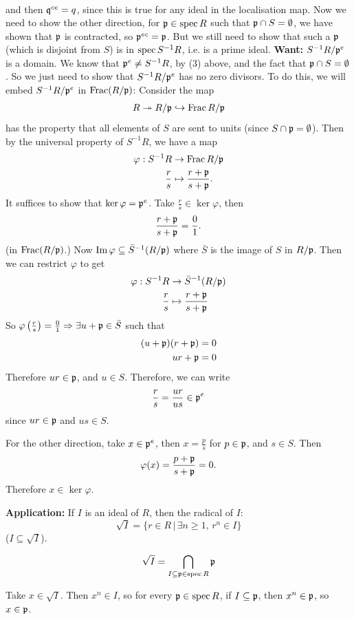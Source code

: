 \documentclass{article}
\begin{document}
\begin{enumerate}
\begin{align*}
    \end{align*}
    and then $\mathfrak{q}^{ce}=q$, since this is true for any ideal in the localisation map. \gap
    Now we need to show the other direction, for $\mathfrak{p} \in \operatorname{spec} R$ such that $\mathfrak{p} \cap S = \emptyset$, we have shown that $\mathfrak{p}$ is contracted, so $\mathfrak{p}^{ec}=\mathfrak{p}$. But we still need to show that such a $\mathfrak{p}$ (which is disjoint from $S$) is in $\operatorname{spec} S^{-1}R$, i.e. is a prime ideal. \gap 
    \textbf{Want:} $S^{-1}R/ \mathfrak{p}^{e}$ is a domain. We know that $\mathfrak{p}^{e} \neq S^{-1}R$, by (3) above, and the fact that $\mathfrak{p} \cap S = \emptyset$. So we just need to show that $S^{-1}R/\mathfrak{p}^{e}$ has no zero divisors. To do this, we will embed $S^{-1}R/\mathfrak{p}^{e}$ in $\operatorname{Frac}(R/\mathfrak{p})$:
    \proof Consider the map 
    \begin{align*}
        R \twoheadrightarrow R/ \mathfrak{p} \hookrightarrow \operatorname{Frac}{R/\mathfrak{p}}
    \end{align*}
    has the property that all elements of $S$ are sent to units (since $S \cap \mathfrak{p} = \emptyset$). Then by the universal property of $S^{-1}R$, we have a map \begin{align*}
        \varphi: S^{-1}R &\to \operatorname{Frac}{R/\mathfrak{p}}\\
        \frac{r}{s} &\mapsto \frac{r+\mathfrak{p}}{s+\mathfrak{p}}.
    \end{align*}
    It suffices to show that $\ker \varphi = \mathfrak{p}^{e}$. Take $\frac{r}{s} \in \ker \varphi$, then \[\frac{r+\mathfrak{p}}{s+\mathfrak{p}} = \frac{0}{1}.\] (in $\operatorname{Frac}(R/\mathfrak{p})$.) Now $\operatorname{Im} \varphi \subseteq \bar S^{-1}(R/\mathfrak{p})$ where $\bar S$ is the image of $S$ in $R/\mathfrak{p}$. Then we can restrict $\varphi$ to get \begin{align*}
        \varphi: S^{-1}R &\to \bar S^{-1}(R/\mathfrak{p})\\
        \frac{r}{s} &\mapsto \frac{r+\mathfrak{p}}{s+\mathfrak{p}}
    \end{align*}
    So $\varphi \left( \frac{r}{s}\right) = \frac{0}{1} \Rightarrow \exists u + \mathfrak{p} \in \bar S$ such that \begin{align*}
        (u+\mathfrak{p})(r+\mathfrak{p})&=0\\
        ur + \mathfrak{p} &=0
    \end{align*}
    Therefore $ur \in \mathfrak{p}$, and $u \in S$. Therefore, we can write \[ \frac{r}{s} = \frac{ur}{us} \in \mathfrak{p}^{e}\] since $ur \in \mathfrak{p}$ and $us \in S$. \gap 

    For the other direction, take $x \in \mathfrak{p}^{e}$, then $x=\frac{p}{s}$ for $p \in \mathfrak{p}$, and $s \in S$. Then \[ \varphi(x) = \frac{p+\mathfrak{p}}{s+\mathfrak{p}}=0.\] Therefore $x \in \ker \varphi$.
    
    \endproof 
\end{enumerate}
\textbf{Application:} If $I$ is an ideal of $R$, then the radical of $I$: \[ \sqrt{I} = \{ r \in R \, | \, \exists n \geq 1, \, r^{n} \in I \} \]
($I \subseteq \sqrt{I}$).
\begin{fancyprop}{}
    \[ \sqrt{I} = \bigcap_{I \subseteq \mathfrak{p} \in \operatorname{spec} R} \mathfrak{p}\]
\end{fancyprop}
\proof Take $x \in \sqrt{I}$. Then $x^{n} \in I$, so for every $\mathfrak{p} \in \operatorname{spec} R$, if $I \subseteq \mathfrak{p}$, then $x^{n} \in \mathfrak{p}$, so $x \in \mathfrak{p}$. \gap
\end{document}

